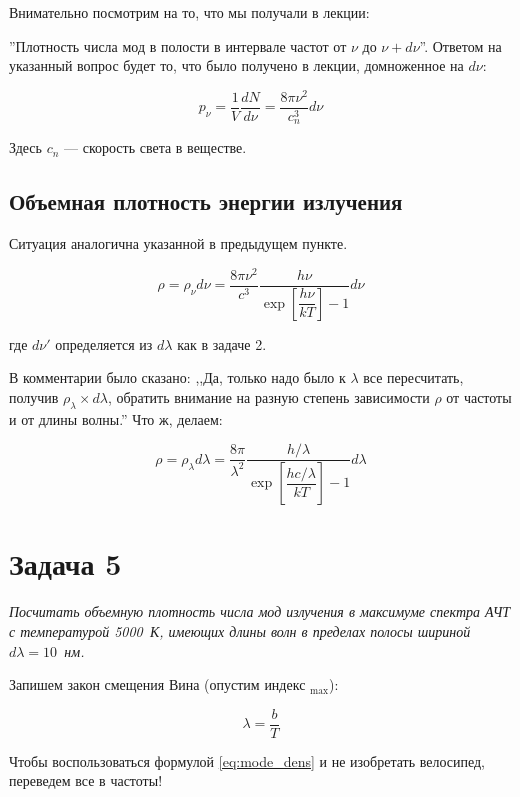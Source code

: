 \documentclass[a4paper, 12pt]{article}
\begin{document}
Внимательно посмотрим на то, что мы получали в лекции:

''Плотность числа мод в полости в интервале частот от $\nu$ до $\nu + d\nu$''. Ответом на указанный вопрос будет то, что было получено в лекции, домноженное на $d\nu$:

\begin{equation}
	p_\nu = \frac{1}{V} \frac{d N}{d\nu} = \frac{8 \pi \nu^2}{c_n^3} d\nu
	\label{eq:mode_dens}
\end{equation}

Здесь $c_n$ --- скорость света в веществе.

\subsection{Объемная плотность энергии излучения}

Ситуация аналогична указанной в предыдущем пункте. 

\begin{equation}
	\rho = \rho_\nu d\nu =  \frac{8 \pi \nu^2}{c^3} \frac{h\nu}{\exp\left[\dfrac{h \nu }{k T}\right] - 1} d\nu
\end{equation}

где $d\nu'$ определяется из $d\lambda$ как в задаче 2.

В комментарии было сказано: ,,Да, только надо было к $\lambda$ все пересчитать, получив $\rho_\lambda \times  d\lambda$, обратить внимание на разную степень зависимости $\rho$ от частоты и от длины волны.'' Что ж, делаем:

\begin{equation}
	\rho = \rho_\lambda d\lambda =  \frac{8 \pi}{\lambda^2} \frac{h/\lambda}{\exp\left[\dfrac{h c/ \lambda }{k T}\right] - 1} d\lambda
\end{equation}


\section{Задача 5}

\textit{Посчитать объемную плотность числа мод излучения в максимуме спектра АЧТ с температурой 5000~К, имеющих длины волн в пределах полосы шириной $d\lambda = 10$~нм.}

Запишем закон смещения Вина (опустим индекс $_\text{max}$):

\begin{equation}
	\lambda = \frac{b}{T}
\end{equation}

Чтобы воспользоваться формулой \ref{eq:mode_dens} и не изобретать велосипед, переведем все в частоты!
\end{document}
